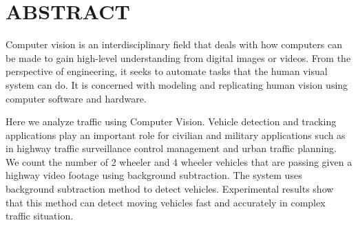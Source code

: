 \documentclass[12pt, a4paper]{article}
\begin{document}
\newpage

\section{ABSTRACT}

\hspace{3cm}
Computer vision is an interdisciplinary field that deals with how computers can be made to gain high-level understanding from digital images or videos. From the perspective of engineering, it seeks to automate tasks that the human visual system can do. It is concerned with modeling and replicating human vision using computer software and hardware.
\par Here we analyze traffic using Computer Vision. Vehicle detection and tracking
applications play an important role for civilian and military applications such as in highway traffic surveillance control management and urban traffic planning. We count the number of 2 wheeler and 4 wheeler vehicles that are passing given a highway video footage using background subtraction. The system uses background subtraction method to detect vehicles. Experimental results show that this method can detect moving vehicles fast and accurately in complex traffic situation.
\vspace{1.5cm}
\end{document}
